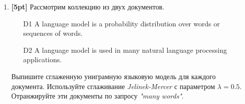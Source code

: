 \begin{enumerate}
	\item \textbf{[5pt]} Рассмотрим коллекцию из двух документов.
	\begin{enumerate}
		\item[D1] A language model is a probability distribution over words or sequences of words.
		\item[D2] A language model is used in many natural language processing applications.
	\end{enumerate}

	Выпишите сглаженную униграмную языковую модель для каждого документа. Используйте сглаживание 
	\textit{Jelinek-Mercer} с параметром $\lambda = 0.5$. Отранжируйте эти документы по запросу 
	\textit{"many words"}.
\end{enumerate}
